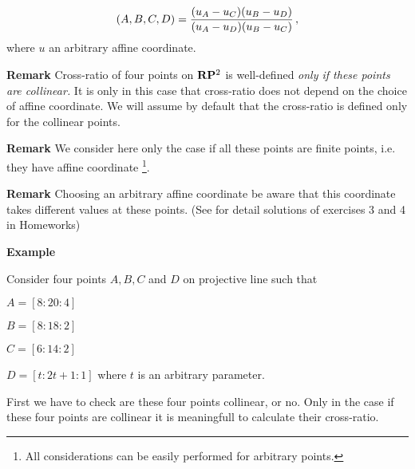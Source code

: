 \documentclass[12pt]{article}
\numberwithin{equation}{section}
\begin{document}

\begin{equation}\label{exampleoffourpointsontheline}
(A,B,C,D)={(u_A-u_C)(u_B-u_D)\over (u_A-u_D)(u_B-u_C)}\,,
\end{equation}
where $u$ an arbitrary affine coordinate.


{\bf Remark}  Cross-ratio of four points on ${\bf R}{\bf P}^2$ is well-defined
{\it only if these points are collinear.}  It is only in this case that
cross-ratio does not depend on the choice of affine coordinate.
We will assume by default that the cross-ratio is defined 
only for the collinear points. 

 
{\bf Remark} We consider here only the case if all 
these points are finite points, i.e. they have affine coordinate
\footnote{All considerations can be easily 
performed for arbitrary points.}.

{\bf Remark} Choosing an arbitrary affine coordinate
be aware that this coordinate takes different values
at these points. (See for detail solutions of exercises 3 and 4 in
Homeworks)

\m


\bigskip

{\bf Example}

Consider four points $A,B,C$ and $D$ on projective line
such that
 
$A=[8:20:4]$

$B=[8:18:2]$

$C=[6:14:2]$

$D=[t:2t+1:1]$ where $t$ is an arbitrary parameter.

First we have to check are these four points collinear, or no.
Only in the case if these four points are collinear it is meaningfull
to calculate their cross-ratio.
\end{document}
